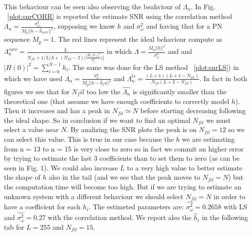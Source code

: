 \documentclass[a4paper,oneside]{article}
\renewcommand{\vec}[1]{\underline{#1}}
\begin{document}
\newline This behaviour can be seen also observing the beahviour of $\Lambda_n$. In Fig. ~\ref{plot:snrCORR} is reported the estimate SNR using the correlation method $\Lambda_n = \frac{\sigma_\omega^2}{M_p || h-\hat{h}_{corr} ||^2}$, supposing we know $h$ and $\sigma_\omega^2$ and having that for a PN sequence $M_p = 1$. The red lines represent the ideal behaviour compute as $\Lambda_n^{corr} = \frac{L}{N_{fil} + 1/L \bigl[ \Lambda + (N_{fil}-2)\bigl(\frac{|H(0)|^2}{\sigma_\omega^2} \bigr)\bigr]}$ in which $\Lambda = \frac{M_p||\vec{h}||^2}{\sigma_\omega^2}$  and and $|H(0)|^2 = \sum_{i=0}^{N-1} h_i$. 
  The same was done for the LS method ~\ref{plot:snrLS}) in which we have used $\Lambda_n = \frac{\sigma_\omega^2}{M_p || h-\hat{h}_ls ||^2}$ and $\Lambda_n^{ls} = \frac{(L+1)(L+1-N_{fil})}{N_{fil}(L+2-N_{fil})}$.
  In fact in both figures we see that for $N_fil$ too low the $\hat{\Lambda_n}$ is significantly smaller than the theoretical one (that assume we have enough coefficients to correctly model $h$). Then it increases and has a peak in $N_{fil} \simeq N$ before starting decreasing following the ideal shape.  So in conclusion if we want to find an optimal $N_{fil}$ we must select a value near $N$. By analizing the SNR plots the peak is on $N_{fil} = 12$ so we can select this value. This is true in our case because the $h$ we are estimating from n = 13 to n = 15 is very close to zero so in fact we commit an higher error by trying to estimate the last 3 coefficients than to set them to zero (as can be seen in Fig. 1). We could also increase $L$ to a very high value to better estimate the shape of $h$ also in the tail (and we see that the peak moves to $N_{fil} = N$) but the computation time will become too high. But if we are trying to estimate an unknown system with a different behaviour we should select $N_{fil} = N$ in order to have a coefficient for each $h_i$. 
  The estimeted parameters are: $\hat{\sigma_\omega^2} = 0.2658$ with LS and $\hat{\sigma_\omega^2} = 0.27$ with the correlation method. We report also the $\hat{h}_i$ in the following tab for $L = 255$ and $N_{fil} = 15$.
  
\end{document}
